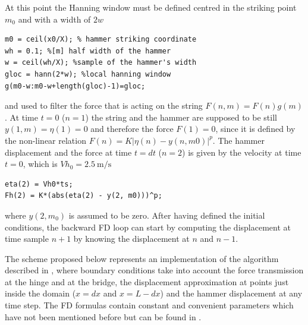 \documentclass[a4paper]{article}
\begin{document}
At this point the Hanning window must be defined centred in the striking point $m_0$ and with a width of $2w$

\begin{verbatim}
m0 = ceil(x0/X); % hammer striking coordinate
wh = 0.1; %[m] half width of the hammer
w = ceil(wh/X); %sample of the hammer's width
gloc = hann(2*w); %local hanning window
g(m0-w:m0-w+length(gloc)-1)=gloc;
\end{verbatim}

and used to filter the force that is acting on the string $F(n,m) = F(n)g(m)$. At time $t=0$ ($n=1$) the string and the hammer are supposed to be still $y(1,m) = \eta(1) = 0$ and therefore the force $F(1) = 0$, since it is defined by the non-linear relation $F(n) = K|\eta(n) - y(n,m0)|^p$. The hammer displacement and the force at time $t= dt$ ($n=2$) is given by the velocity at time $t=0$, which is $Vh_0 = \SI{2.5}{\meter\per\second}$

\begin{verbatim}
eta(2) = Vh0*ts;
Fh(2) = K*(abs(eta(2) - y(2, m0)))^p;
\end{verbatim}

where $y(2,m_0)$ is assumed to be zero. After having defined the initial conditions, the backward FD loop can start by computing the displacement at time sample $n+1$ by knowing the displacement at $n$ and $n-1$.

 The scheme proposed below represents an implementation of the algorithm described in \cite{saitis}, where boundary conditions take into account the force transmission at the hinge and at the bridge, the displacement approximation at points just inside the domain ($x = dx$ and $x = L- dx$) and the hammer displacement at any time step. The FD formulas contain constant and convenient parameters which have not been mentioned before but can be found in \cite{saitis}.
 
\end{document}
